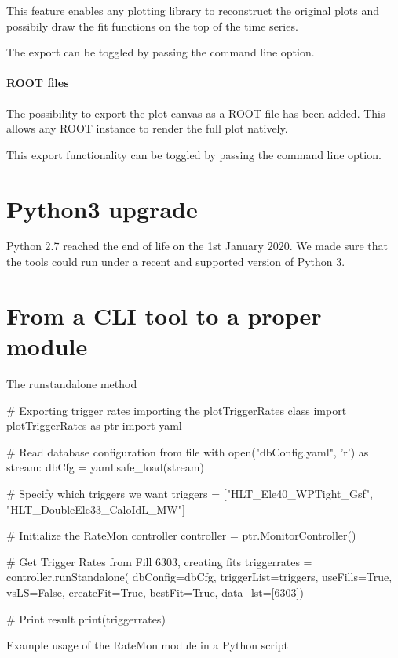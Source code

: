 This feature enables any plotting library to reconstruct the original plots and possibily draw the fit functions on the top of the time series.

The export can be toggled by passing the  command line option.

\paragraph{ROOT files}

The possibility to export the plot canvas as a ROOT file has been added. This allows any ROOT instance to render the full plot natively.

This export functionality can be toggled by passing the  command line option.

\section{Python3 upgrade}

Python 2.7 reached the end of life on the 1st January 2020. We made sure \cite{Python3migration4MergeRequestsCMSTSGFOGratemonGitLab-2020-10-07} that the tools could run under a recent and supported version of Python 3.

\section{From a CLI tool to a proper module}

The runstandalone method \cite{RestructuretheplotTriggerRatescripttobeusedasamodule7MergeRequestsCMSTSGFOGratemonGitLab-2020-10-07}


\begin{listing}[ht]
\begin{pythoncode}
# Exporting trigger rates importing the plotTriggerRates class
import plotTriggerRates as ptr
import yaml

# Read database configuration from file
with open("dbConfig.yaml", 'r') as stream:
    dbCfg = yaml.safe_load(stream)

# Specify which triggers we want
triggers = ["HLT_Ele40_WPTight_Gsf",
              "HLT_DoubleEle33_CaloIdL_MW"]

# Initialize the RateMon controller
controller = ptr.MonitorController()

# Get Trigger Rates from Fill 6303, creating fits
triggerrates = controller.runStandalone(
                         dbConfig=dbCfg,
                         triggerList=triggers,
                         useFills=True,
                         vsLS=False,
                         createFit=True,
                         bestFit=True,
                         data_lst=[6303])

# Print result
print(triggerrates)
\end{pythoncode}
\caption{Example usage of the RateMon module in a Python script}
\end{listing}

